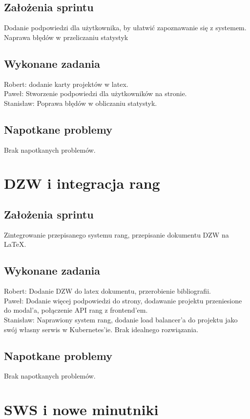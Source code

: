 \documentclass[a4paper,11pt]{report}
\begin{document}
\subsection {Założenia sprintu}
Dodanie podpowiedzi dla użytkownika, by ułatwić zapoznawanie się z systemem. Naprawa błędów w przeliczaniu statystyk
\subsection {Wykonane zadania}
Robert: dodanie karty projektów w latex.\\
Paweł: Stworzenie podpowiedzi dla użytkowników na stronie. \\
Stanisław: Poprawa błędów w obliczaniu statystyk.  \\
\subsection {Napotkane problemy}
Brak napotkanych problemów.

\section {DZW i integracja rang}
\subsection {Założenia sprintu}
Zintegrowanie przepisanego systemu rang, przepisanie dokumentu DZW na LaTeX.
\subsection {Wykonane zadania}
Robert: Dodanie DZW do latex dokumentu, przerobienie bibliografii.\\ 
Paweł: Dodanie więcej podpowiedzi do strony, dodawanie projektu przeniesione do modal'a, połączenie API rang z frontend'em.\\
Stanisław: Naprawiony system rang, dodanie load balancer'a do projektu jako swój własny serwis w Kubernetes'ie. Brak idealnego rozwiązania. \\
\subsection {Napotkane problemy}
Brak napotkanych problemów.

\section {SWS i nowe minutniki}
\label{sec:zarzadzanie_czasomierzem}
\end{document}

